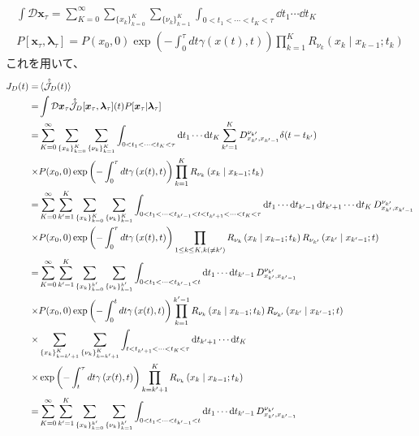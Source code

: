 \documentclass{ltjsarticle}
\begin{document}
\begin{align}
  \int \mathcal{D}\bm{x}_\tau=\sum_{K=0}^{\infty}\sum_{\lbrace x_k\rbrace_{k=0}^K}\sum_{\lbrace\nu_k\rbrace_{k=1}^K}\int_{0<t_1<\cdots<t_K<\tau}\dd{t_1}\cdots \dd{t_K}\\
  P[\bm{x}_\tau,\bm{\lambda}_\tau]=P(x_0,0)\exp\left(-\int_0^\tau dt\gamma\left(x(t),t\right)\right)\prod_{k=1}^K R_{\nu_k}\left(x_k\mid x_{k-1};t_k\right)
\end{align}
これを用いて、
\begin{align}
  J_D(t)=&\ev*{\hat{\dot{\mathcal{J}}}_D(t)}\\
  =&\int \mathcal{D}\bm{x}_\tau \hat{\dot{\mathcal{J}}}_D[\bm{x}_\tau,\bm{\lambda}_\tau](t)P[\bm{x}_\tau|\bm{\lambda}_\tau]\\
  =&\sum_{K=0}^{\infty}\sum_{\lbrace x_k\rbrace_{k=0}^K}\sum_{\lbrace\nu_k\rbrace_{k=1}^K}\int_{0<t_1<\cdots<t_K<\tau}\dd{t_1}\cdots \dd{t_K}\sum_{k'=1}^K D^{\nu_{k'}}_{x_{k'},x_{k'-1}}\delta(t-t_{k'})\\
  \times&P(x_0,0)\exp\left(-\int_0^\tau dt\gamma\left(x(t),t\right)\right)\prod_{k=1}^K R_{\nu_k}\left(x_k\mid x_{k-1};t_k\right)\\
  =&\sum_{K=0}^{\infty}\sum_{k'=1}^K\sum_{\lbrace x_k\rbrace_{k=0}^K}\sum_{\lbrace\nu_k\rbrace_{k=1}^K}\int_{0<t_1<\cdots<t_{k'-1}<t<t_{k'+1}<\cdots<t_K<\tau}\dd{t_1}\cdots\dd{t_{k'-1}}\dd{t_{k'+1}}\cdots \dd{t_K} D^{\nu_{k'}}_{x_{k'},x_{k'-1}}\\
  \times&P(x_0,0)\exp\left(-\int_0^\tau dt\gamma\left(x(t),t\right)\right)\prod_{1\le k\le K,k(\neq k')} R_{\nu_{k}}\left(x_{k}\mid x_{k-1};t_k\right)R_{\nu_{k'}}\left(x_{k'}\mid x_{k'-1};t\right)\\
  =&\sum_{K=0}^{\infty}\sum_{k'=1}^K\sum_{\lbrace x_k\rbrace_{k=0}^{k'}}\sum_{\lbrace\nu_k\rbrace_{k=1}^{k'}}\int_{0<t_1<\cdots<t_{k'-1}<t}\dd{t_1}\cdots\dd{t_{k'-1}}D^{\nu_{k'}}_{x_{k'},x_{k'-1}} \\
  \times&P(x_0,0)\exp\left(-\int_0^t dt\gamma\left(x(t),t\right)\right)\prod_{k=1}^{k'-1} R_{\nu_k}\left(x_k\mid x_{k-1};t_k\right)R_{\nu_{k'}}\left(x_{k'}\mid x_{k'-1};t\right)\\
  \times&\sum_{\lbrace x_k\rbrace_{k=k'+1}^{K}}\sum_{\lbrace\nu_k\rbrace_{k=k'+1}^{K}}\int_{t<t_{k'+1}<\cdots<t_K<\tau}\dd{t_{k'+1}}\cdots \dd{t_K}\\
  \times&\exp\left(-\int_t^\tau dt\gamma\left(x(t),t\right)\right)\prod_{k=k'+1}^K R_{\nu_k}\left(x_k\mid x_{k-1};t_k\right)\\
  =&\sum_{K=0}^{\infty}\sum_{k'=1}^K\sum_{\lbrace x_k\rbrace_{k=0}^{k'}}\sum_{\lbrace\nu_k\rbrace_{k=1}^{k'}}\int_{0<t_1<\cdots<t_{k'-1}<t}\dd{t_1}\cdots\dd{t_{k'-1}}D^{\nu_{k'}}_{x_{k'},x_{k'-1}} \\

\end{align}
\end{document}
